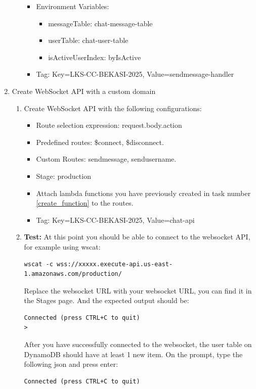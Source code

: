 \documentclass{article}
\begin{document}
\begin{enumerate}
\begin{enumerate}
\begin{itemize}
      \item Environment Variables:
      \begin{itemize}
        \item messageTable: chat-message-table
        \item userTable: chat-user-table
        \item isActiveUserIndex: byIsActive
      \end{itemize}
      \item Tag: Key=LKS-CC-BEKASI-2025, Value=sendmessage-handler
    \end{itemize}
  \end{enumerate}
  \item Create WebSocket API with a custom domain
    \begin{enumerate}
      \item Create WebSocket API with the following configurations:
      \begin{itemize}
        \item Route selection expression: request.body.action
        \item Predefined routes: \$connect, \$disconnect.
        \item Custom Routes: sendmessage, sendusername.
        \item Stage: production
        \item Attach lambda functions you have previously created in task number \ref{create_function} to the routes.
      \item Tag: Key=LKS-CC-BEKASI-2025, Value=chat-api
      \end{itemize}
      \item {\color{red}\textbf{Test:}} At this point you should be able to connect to the websocket API, for example using wscat:
      \begin{verbatim}
wscat -c wss://xxxxx.execute-api.us-east-1.amazonaws.com/production/
      \end{verbatim}
      Replace the websocket URL with your websocket URL, you can find it in the Stages page. And the expected output should be:
      \begin{verbatim}
Connected (press CTRL+C to quit)
>
      \end{verbatim}
      After you have successfully connected to the websocket, the user table on DynamoDB should have at least 1 new item.
      On the prompt, type the following json and press enter:
      \begin{verbatim}
Connected (press CTRL+C to quit)

\end{verbatim}
\end{enumerate}
\end{enumerate}
\end{document}
